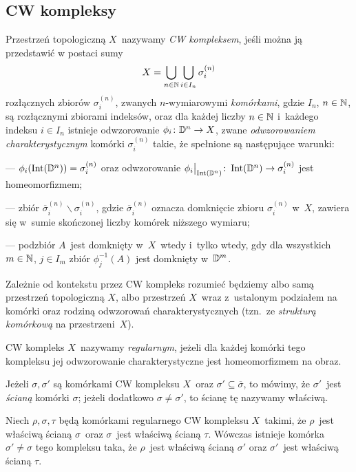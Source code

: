 \subsection{CW kompleksy}
Przestrzeń topologiczną $X$~nazywamy \textit{CW kompleksem}, jeśli można ją przedstawić w postaci sumy 
\[X=\bigcup_{n\in\mathbb{N}}\bigcup_{i\in I_n} \sigma^{(n)}_{i}\]
rozłącznych zbiorów $\sigma^{(n)}_i$, zwanych $n$-wymiarowymi \textit{komórkami}, gdzie $I_n$, $n\in \mathbb{N}$, są rozłącznymi zbiorami indeksów, oraz dla każdej liczby $n\in \mathbb{N}$ i~każdego indeksu $i\in I_n$ istnieje odwzorowanie $\phi_i\colon \mathbb{D}^n \rightarrow X$, zwane \textit{odwzorowaniem charakterystycznym} komórki $\sigma_i^{(n)}$ takie, że spełnione są następujące warunki:
\begin{compactitem}
\item[---] $\phi_i(\operatorname{Int}(\mathbb{D}^n))=\sigma^{(n)}_i$ oraz odwzorowanie $\phi_i\big|_{\operatorname{Int}(\mathbb{D}^n)}\colon \operatorname{Int}(\mathbb{D}^n)\to \sigma^{(n)}_i$ jest homeomorfizmem;
\item[---] zbiór $\overline{\sigma}^{(n)}_i\smallsetminus \sigma^{(n)}_i$, gdzie $\overline{\sigma}^{(n)}_i$ oznacza domknięcie zbioru $\sigma^{(n)}_i$ w~$X$, zawiera się w~sumie skończonej liczby komórek niższego wymiaru;
\item[---] podzbiór $A$~jest domknięty w~$X$~wtedy i~tylko wtedy, gdy dla wszystkich $m\in\mathbb{N}$, $j\in I_m$ zbiór $\phi_j^{-1}(A)$ jest domknięty w~$\mathbb{D}^m$. 
\end{compactitem}
Zależnie od kontekstu przez CW kompleks rozumieć będziemy albo samą przestrzeń topologiczną $X$, albo przestrzeń $X$~wraz z~ustalonym podziałem na komórki oraz rodziną odwzorowań charakterystycznych (tzn.~ze \textit{strukturą komórkową} na przestrzeni~$X$).

CW kompleks $X$~nazywamy \textit{regularnym}, jeżeli dla każdej komórki tego kompleksu jej odwzorowanie charakterystyczne jest homeomorfizmem na obraz.

Jeżeli $\sigma,\sigma'$ są komórkami CW kompleksu $X$~oraz $\sigma'\subseteq \overline{\sigma}$, to mówimy, że $\sigma'$~jest \textit{ścianą} komórki $\sigma$; jeżeli dodatkowo $\sigma\not=\sigma'$, to ścianę tę nazywamy właściwą.

\begin{lem}\label{lem-miedzy_komorkami_leza_dwie_komorki}
Niech $\rho,\sigma,\tau$ będą komórkami regularnego CW kompleksu $X$~takimi, że $\rho$~jest właściwą ścianą $\sigma$~oraz $\sigma$~jest właściwą ścianą $\tau$. Wówczas istnieje komórka $\sigma'\not=\sigma$ tego kompleksu taka, że $\rho$~jest właściwą ścianą $\sigma'$ oraz $\sigma'$~jest właściwą ścianą $\tau$.
\end{lem}

